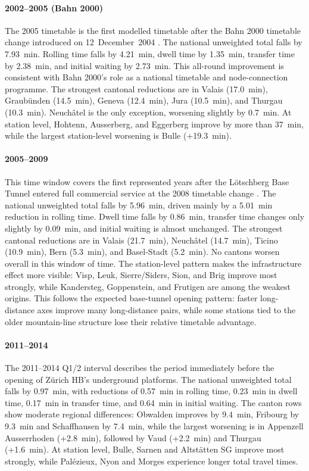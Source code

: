 \documentclass[preprint,12pt]{elsarticle}
\begin{document}
\paragraph{2002--2005 (Bahn 2000)}
The 2005 timetable is the first modelled timetable after the Bahn 2000 timetable change introduced on 12~December~2004 \citep{sbbRail2000Timetable2004}. The national unweighted total falls by 7.93~min. Rolling time falls by 4.21~min, dwell time by 1.35~min, transfer time by 2.38~min, and initial waiting by 2.73~min. This all-round improvement is consistent with Bahn 2000's role as a national timetable and node-connection programme. The strongest cantonal reductions are in Valais (17.0~min), Graubünden (14.5~min), Geneva (12.4~min), Jura (10.5~min), and Thurgau (10.3~min). Neuchâtel is the only exception, worsening slightly by 0.7~min. At station level, Hohtenn, Ausserberg, and Eggerberg improve by more than 37~min, while the largest station-level worsening is Bulle (+19.3~min).

\paragraph{2005--2009}
This time window covers the first represented years after the Lötschberg Base Tunnel entered full commercial service at the 2008 timetable change \citep{blsLoetschbergHistory}. The national unweighted total falls by 5.96~min, driven mainly by a 5.01~min reduction in rolling time. Dwell time falls by 0.86~min, transfer time changes only slightly by 0.09~min, and initial waiting is almost unchanged. The strongest cantonal reductions are in Valais (21.7~min), Neuchâtel (14.7~min), Ticino (10.9~min), Bern (5.3~min), and Basel-Stadt (5.2~min). No cantons worsen overall in this window of time. The station-level pattern makes the infrastructure effect more visible: Visp, Leuk, Sierre/Siders, Sion, and Brig improve most strongly, while Kandersteg, Goppenstein, and Frutigen are among the weakest origins. This follows the expected base-tunnel opening pattern: faster long-distance axes improve many long-distance pairs, while some stations tied to the older mountain-line structure lose their relative timetable advantage.

\paragraph{2011--2014}
The 2011--2014 Q1/2 interval describes the period immediately before the opening of Zürich HB's underground platforms. The national unweighted total falls by 0.97~min, with reductions of 0.57~min in rolling time, 0.23~min in dwell time, 0.17~min in transfer time, and 0.64~min in initial waiting. The canton rows show moderate regional differences: Obwalden improves by 9.4~min, Fribourg by 9.3~min and Schaffhausen by 7.4~min, while the largest worsening is in Appenzell Ausserrhoden (+2.8~min), followed by Vaud (+2.2~min) and Thurgau (+1.6~min). At station level, Bulle, Sarnen and Altstätten SG improve most strongly, while Palézieux, Nyon and Morges experience longer total travel times.
\end{document}
